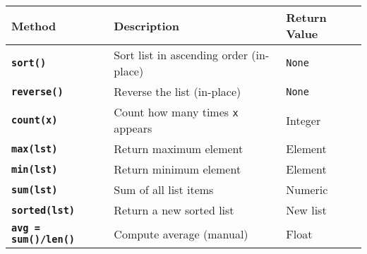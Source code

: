 \documentclass[a4paper,11pt]{article}
\begin{document}
	\begin{tabular}{>{\bfseries}p{3.5cm} p{6cm} p{3.5cm}}
		\toprule
		Method & Description & Return Value \\
		\midrule
		
		\texttt{sort()}        & Sort list in ascending order (in-place) & \texttt{None} \\
		\texttt{reverse()}     & Reverse the list (in-place) & \texttt{None} \\
		\texttt{count(x)}      & Count how many times \texttt{x} appears & Integer \\
		\texttt{max(lst)}      & Return maximum element & Element \\
		\texttt{min(lst)}      & Return minimum element & Element \\
		\texttt{sum(lst)}      & Sum of all list items & Numeric \\
		\texttt{sorted(lst)}   & Return a new sorted list & New list \\
		\texttt{avg = sum()/len()} & Compute average (manual) & Float \\
		
		\bottomrule
	\end{tabular}
	
	
	
	
	
	
	
	
\end{document}
